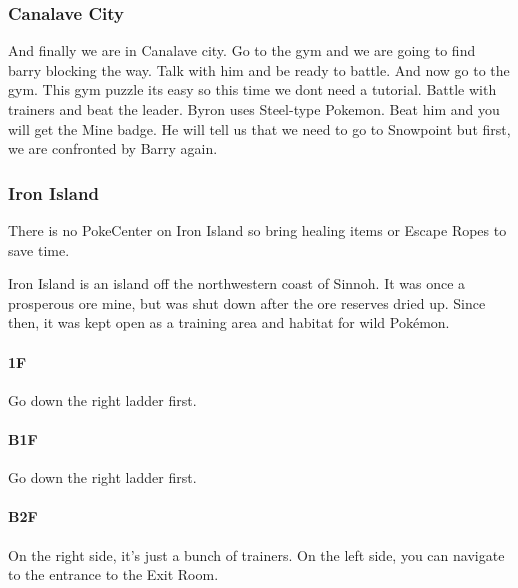 \documentclass[11pt]{article}
\begin{document}


\subsubsection{Canalave City}\label{subsubsec:canalave-city}
And finally we are in Canalave city.
Go to the gym and we are going to find barry blocking the way.
Talk with him and be ready to battle.
And now go to the gym.
This gym puzzle its easy so this time we dont need a tutorial.
Battle with trainers and beat the leader.
Byron uses Steel-type Pokemon.
Beat him and you will get the Mine badge.
He will tell us that we need to go to Snowpoint but first,
we are confronted by Barry again.

\subsubsection{Iron Island}\label{subsubsec:iron-island}
There is no PokeCenter on Iron Island so bring healing items or Escape Ropes to save time.

Iron Island is an island off the northwestern coast of Sinnoh.
It was once a prosperous ore mine, but was shut down after the ore reserves dried up.
Since then, it was kept open as a training area and habitat for wild Pokémon.

% 

\paragraph{1F}
Go down the right ladder first.



\paragraph{B1F}
Go down the right ladder first.




\paragraph{B2F}
On the right side, it's just a bunch of trainers.
On the left side, you can navigate to the entrance to the Exit Room.
\end{document}
